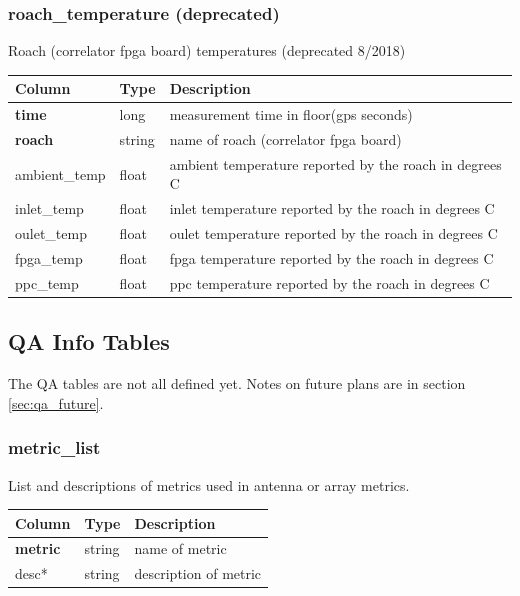 \documentclass{article}
\begin{document}
{\begin{center}
\begin{tabular}{| p{5cm} | p{2cm} | p{10cm} |}
\end{tabular}
\end{center}


\subsubsection{roach\_temperature (deprecated)}
Roach (correlator fpga board) temperatures (deprecated 8/2018)
\begin{center}
 \begin{tabular}{| p{4cm} | p{2cm} | p{10cm} |}
\hline
 {\bf Column} & {\bf Type}  & {\bf Description} \\ [0.5ex]  \hline\hline
\textbf{time} & long & measurement time in floor(gps seconds)\\ \hline
\textbf{roach} & string & name of roach (correlator fpga board) \\ \hline
ambient\_temp & float & ambient temperature reported by the roach in degrees C \\\hline
inlet\_temp & float & inlet temperature reported by the roach in degrees C \\\hline
oulet\_temp & float & oulet temperature reported by the roach in degrees C \\\hline
fpga\_temp & float & fpga temperature reported by the roach in degrees C \\\hline
ppc\_temp & float & ppc temperature reported by the roach in degrees C \\\hline
\end{tabular}
\end{center}



\subsection{QA Info Tables}
The QA tables are not all defined yet. Notes on future plans are in section \ref{sec:qa_future}.

\subsubsection{metric\_list}
List and descriptions of metrics used in antenna or array metrics.

\begin{center}
 \begin{tabular}{| p{4cm} | p{2cm} | p{10cm} |}
\hline
 {\bf Column} & {\bf Type}  & {\bf Description} \\ [0.5ex]  \hline\hline
\textbf{metric} & string & name of metric \\ \hline
desc* & string & description of metric \\ \hline
\end{tabular}
\end{center}

}
\end{document}
